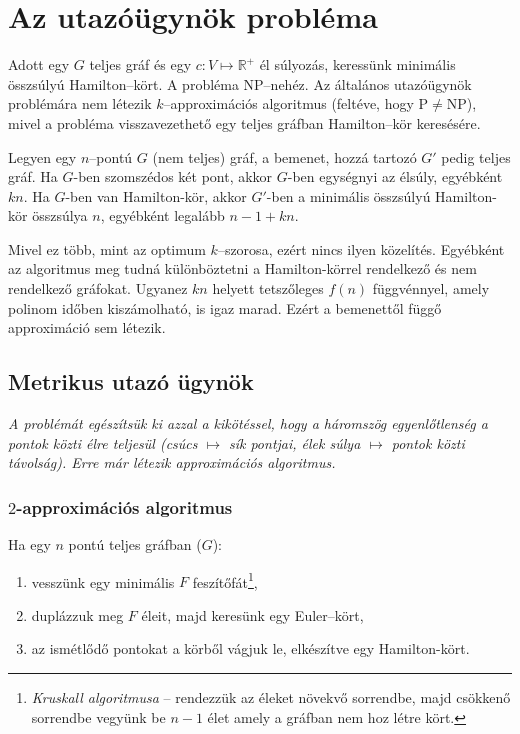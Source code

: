 \skiptooddpage%
\section{Az utazóügynök probléma}

Adott egy $G$ teljes gráf és egy $c:V \mapsto \mathbb{R}^+$ él súlyozás,
keressünk minimális összsúlyú Hamilton--kört. A probléma NP--nehéz. Az általános
utazóügynök problémára nem létezik $k$--approximációs algoritmus (feltéve, hogy
P$\ne$NP), mivel a probléma visszavezethető egy teljes gráfban Hamilton--kör
keresésére.

Legyen egy $n$--pontú $G$ (nem teljes) gráf, a bemenet, hozzá tartozó $G'$ pedig
teljes gráf. Ha $G$-ben szomszédos két pont, akkor $G$-ben egységnyi az élsúly,
egyébként $kn$. Ha $G$-ben van Hamilton-kör, akkor $G'$-ben a minimális
összsúlyú Hamilton-kör összsúlya $n$, egyébként legalább $n-1+kn$.

Mivel ez több, mint az optimum $k$--szorosa, ezért nincs ilyen közelítés.
Egyébként az algoritmus meg tudná különböztetni a Hamilton-körrel rendelkező és
nem rendelkező gráfokat. Ugyanez $kn$ helyett tetszőleges $f(n)$ függvénnyel,
amely polinom időben kiszámolható, is igaz marad. Ezért a bemenettől függő
approximáció sem létezik.

\subsection{Metrikus utazó ügynök}

\emph{A problémát egészítsük ki azzal a kikötéssel, hogy a háromszög
	egyenlőtlenség a pontok közti élre teljesül (csúcs $\mapsto$ sík pontjai, élek
	súlya $\mapsto$ pontok közti távolság). Erre már létezik approximációs
	algoritmus.}

\subsubsection{$2$-approximációs algoritmus}

Ha egy $n$ pontú teljes gráfban ($G$):
\begin{enumerate}
	\item vesszünk egy minimális $F$ feszítőfát\footnote{\emph{Kruskall algoritmusa} --
		      rendezzük az éleket növekvő sorrendbe, majd csökkenő sorrendbe vegyünk be $n-1$ élet
		      amely a gráfban nem hoz létre kört.},
	\item duplázzuk meg $F$ éleit, majd keresünk egy Euler--kört,
	\item az ismétlődő pontokat a körből vágjuk le, elkészítve egy Hamilton-kört.
\end{enumerate}

